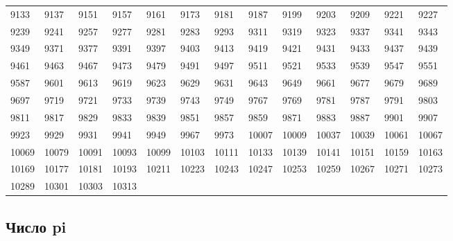 \documentclass[12pt, a4paper]{article}
\begin{document}
\begin{longtable}{lllll lllll lll}
9133 &9137 &9151 &9157 &9161 &9173 &9181 &9187 &9199 &9203 &9209 &9221 &9227 \\
9239 &9241 &9257 &9277 &9281 &9283 &9293 &9311 &9319 &9323 &9337 &9341 &9343 \\
9349 &9371 &9377 &9391 &9397 &9403 &9413 &9419 &9421 &9431 &9433 &9437 &9439 \\
9461 &9463 &9467 &9473 &9479 &9491 &9497 &9511 &9521 &9533 &9539 &9547 &9551 \\
9587 &9601 &9613 &9619 &9623 &9629 &9631 &9643 &9649 &9661 &9677 &9679 &9689 \\
9697 &9719 &9721 &9733 &9739 &9743 &9749 &9767 &9769 &9781 &9787 &9791 &9803 \\
9811 &9817 &9829 &9833 &9839 &9851 &9857 &9859 &9871 &9883 &9887 &9901 &9907 \\
9923 &9929 &9931 &9941 &9949 &9967 &9973 &10007 &10009 &10037 &10039 &10061 &10067 \\
10069 &10079 &10091 &10093 &10099 &10103 &10111 &10133 &10139 &10141 &10151 &10159 &10163 \\
10169 &10177 &10181 &10193 &10211 &10223 &10243 &10247 &10253 &10259 &10267 &10271 &10273 \\
10289 &10301 &10303 &10313 &


\end{longtable}

\normalsize

\subsection{Число pi}
\end{document}
